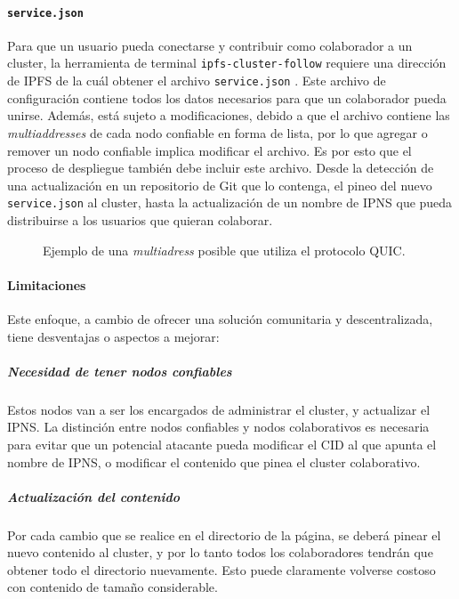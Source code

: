 \paragraph{\texttt{service.json}} Para que un usuario pueda conectarse y contribuir como colaborador a un cluster, la herramienta de terminal \texttt{ipfs-cluster-follow} \cite{ipfs-cluster-follow} requiere una dirección de IPFS de la cuál obtener el archivo \texttt{service.json} \cite{service-json}. Este archivo de configuración contiene todos los datos necesarios para que un colaborador pueda unirse. Además, está sujeto a modificaciones, debido a que el archivo contiene las \textit{multiaddresses} \cite{multiaddr} de cada nodo confiable en forma de lista, por lo que agregar o remover un nodo confiable implica modificar el archivo. Es por esto que el proceso de despliegue también debe incluir este archivo. Desde la detección de una actualización en un repositorio de Git que lo contenga, el pineo del nuevo \texttt{service.json} al cluster, hasta la actualización de un nombre de IPNS que pueda distribuirse a los usuarios que quieran colaborar.

\begin{figure}[h]
\centering
{}
\caption{Ejemplo de una \textit{multiadress} posible que utiliza el protocolo QUIC.}
\end{figure}

\paragraph{Limitaciones}

Este enfoque, a cambio de ofrecer una solución comunitaria y descentralizada, tiene desventajas o aspectos a mejorar:

\subparagraph{Necesidad de tener nodos confiables} Estos nodos van a ser los encargados de administrar el cluster, y actualizar el IPNS. La distinción entre nodos confiables y nodos colaborativos es necesaria para evitar que un potencial atacante pueda modificar el CID al que apunta el nombre de IPNS, o modificar el contenido que pinea el cluster colaborativo.
 
\subparagraph{Actualización del contenido} Por cada cambio que se realice en el directorio de la página, se deberá pinear el nuevo contenido al cluster, y por lo tanto todos los colaboradores tendrán que obtener todo el directorio nuevamente. Esto puede claramente volverse costoso con contenido de tamaño considerable.
    
